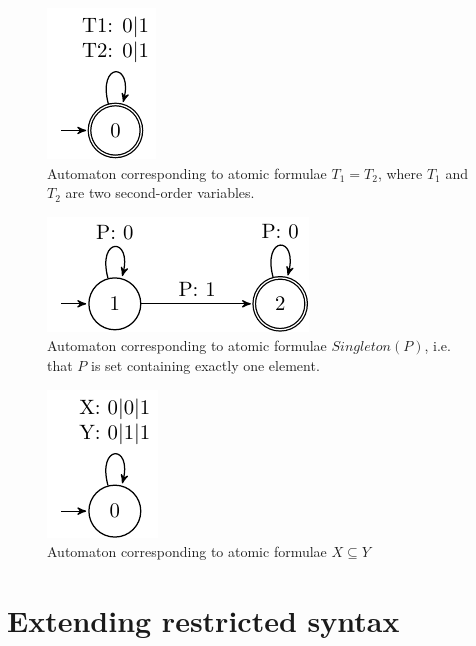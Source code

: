 \begin{figure}[h!]
 \begin{center}
  \includegraphics{fig/atomic-equal-terms}
 \end{center}
 \caption{Automaton corresponding to atomic formulae $T_1 = T_2$, where $T_1$
 and $T_2$ are two second-order variables.}
\end{figure}

\begin{figure}[h!]
 \begin{center}
  \includegraphics{fig/atomic-singleton}
 \end{center}
 \caption{Automaton corresponding to atomic formulae $\mathit{Singleton}(P)$,
 i.e. that $P$ is set containing exactly one element.}
\end{figure}

\begin{figure}[h!]
 \begin{center}
  \includegraphics{fig/atomic-subset}
 \end{center}
 \caption{Automaton corresponding to atomic formulae $X \subseteq Y$}
\end{figure}
\newpage
\section{Extending restricted syntax}

